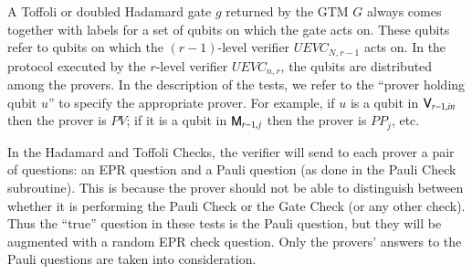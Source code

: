 A Toffoli or doubled Hadamard gate $g$ returned by the GTM $G$ always comes together with labels for a set of qubits on which the gate acts on. These qubits refer to qubits on which the $(r-1)$-level verifier $UEVC_{N,r-1}$ acts on. In the protocol executed by the $r$-level verifier $UEVC_{n,r}$, the qubits are distributed among the provers. In the description of the tests, we refer to the ``prover holding qubit $u$'' to specify the appropriate prover. For example, if $u$ is a qubit in ${\textsf{V}}_{r-1,in}$ then the prover is $PV$; if it is a qubit in ${\textsf{M}}_{r-1,j}$ then the prover is $PP_j$, etc. 

In the Hadamard and Toffoli Checks, the verifier will send to each prover a pair of questions: an EPR question and a Pauli question (as done in the Pauli Check subroutine). This is because the prover should not be able to distinguish between whether it is performing the Pauli Check or the Gate Check (or any other check). Thus the ``true'' question in these tests is the Pauli question, but they will be augmented with a random EPR check question. Only the provers' answers to the Pauli questions are taken into consideration.

